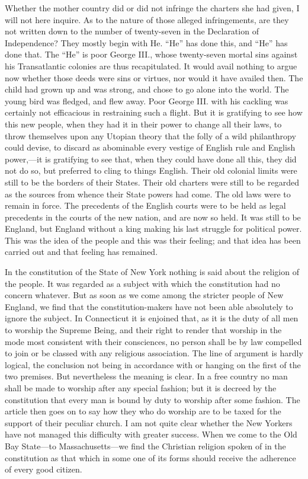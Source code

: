Whether the mother country did or did not infringe the charters she
had given, I will not here inquire.  As to the nature of those
alleged infringements, are they not written down to the number of
twenty-seven in the Declaration of Independence?  They mostly begin
with He.  ``He'' has done this, and ``He'' has done that.  The ``He'' is
poor George III., whose twenty-seven mortal sins against his
Transatlantic colonies are thus recapitulated.  It would avail
nothing to argue now whether those deeds were sins or virtues, nor
would it have availed then.  The child had grown up and was strong,
and chose to go alone into the world.  The young bird was fledged,
and flew away.  Poor George III. with his cackling was certainly
not efficacious in restraining such a flight.  But it is gratifying
to see how this new people, when they had it in their power to
change all their laws, to throw themselves upon any Utopian theory
that the folly of a wild philanthropy could devise, to discard as
abominable every vestige of English rule and English power,---it is
gratifying to see that, when they could have done all this, they
did not do so, but preferred to cling to things English.  Their old
colonial limits were still to be the borders of their States.
Their old charters were still to be regarded as the sources from
whence their State powers had come.  The old laws were to remain in
force.  The precedents of the English courts were to be held as
legal precedents in the courts of the new nation, and are now so
held.  It was still to be England, but England without a king
making his last struggle for political power.  This was the idea of
the people and this was their feeling; and that idea has been
carried out and that feeling has remained.

In the constitution of the State of New York nothing is said about
the religion of the people.  It was regarded as a subject with
which the constitution had no concern whatever.  But as soon as we
come among the stricter people of New England, we find that the
constitution-makers have not been able absolutely to ignore the
subject.  In Connecticut it is enjoined that, as it is the duty of
all men to worship the Supreme Being, and their right to render
that worship in the mode most consistent with their consciences, no
person shall be by law compelled to join or be classed with any
religious association.  The line of argument is hardly logical, the
conclusion not being in accordance with or hanging on the first of
the two premises.  But nevertheless the meaning is clear.  In a
free country no man shall be made to worship after any special
fashion; but it is decreed by the constitution that every man is
bound by duty to worship after some fashion.  The article then goes
on to say how they who do worship are to be taxed for the support
of their peculiar church.  I am not quite clear whether the New
Yorkers have not managed this difficulty with greater success.
When we come to the Old Bay State---to Massachusetts---we find the
Christian religion spoken of in the constitution as that which in
some one of its forms should receive the adherence of every good
citizen.

